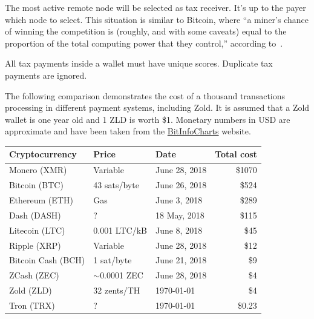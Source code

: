 \documentclass[11pt,oneside]{article}
\begin{document}
The most active remote node will be selected as tax receiver.
It's up to the payer which node to select. This situation is similar
to Bitcoin, where ``a miner's chance of winning the
competition is (roughly, and with some caveats) equal to the proportion of the total computing
power that they control,'' according to~\textcite{foroglou2015}.

All tax payments inside a wallet must have unique scores.
Duplicate tax payments are ignored.

The following comparison demonstrates the cost of a thousand transactions
processing in different payment systems, including Zold.
It is assumed that a Zold wallet is one year old
and 1 ZLD is worth \$1. Monetary numbers in USD are approximate and have
been taken from the \href{https://bitinfocharts.com/}{BitInfoCharts} website.

\begin{tabular}{lllr}
\hline
Cryptocurrency & Price & Date & Total cost \\
\hline
Monero (XMR) &
   Variable\footnotemark &
   June 28, 2018 &
   \$1070 \\
Bitcoin (BTC) &
  43 sats/byte\footnotemark &
  June 26, 2018 &
  \$524 \\
Ethereum (ETH) &
  Gas\footnotemark &
  June 3, 2018 &
  \$289 \\
Dash (DASH) &
  ? &
  18 May, 2018 &
  \$115 \\
Litecoin (LTC) &
  0.001 LTC/kB\footnotemark &
  June 8, 2018 &
  \$45 \\
Ripple (XRP) &
   Variable\footnotemark &
   June 28, 2018 &
   \$12 \\
Bitcoin Cash (BCH) &
  1 sat/byte &
  June 21, 2018 &
  \$9 \\
ZCash (ZEC) &
   $\sim$0.0001 ZEC &
   June 28, 2018 &
   \$4 \\   
Zold (ZLD) &
  32 zents/TH &
  \today &
  \$4 \\
Tron (TRX) &
  ? &
  \today &
  \$0.23 \\
\hline
\end{tabular}

\end{document}
